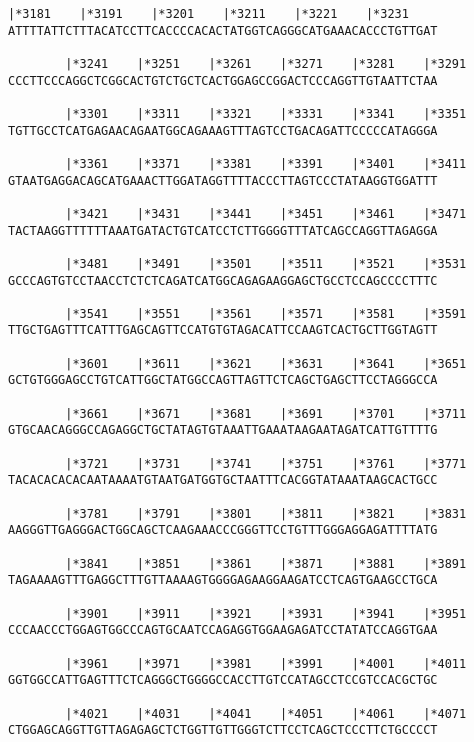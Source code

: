 \documentclass{article}
\begin{document}
\newpage
\begin{Verbatim}[fontfamily=courier]
        |*3181    |*3191    |*3201    |*3211    |*3221    |*3231
ATTTTATTCTTTACATCCTTCACCCCACACTATGGTCAGGGCATGAAACACCCTGTTGAT

        |*3241    |*3251    |*3261    |*3271    |*3281    |*3291
CCCTTCCCAGGCTCGGCACTGTCTGCTCACTGGAGCCGGACTCCCAGGTTGTAATTCTAA

        |*3301    |*3311    |*3321    |*3331    |*3341    |*3351
TGTTGCCTCATGAGAACAGAATGGCAGAAAGTTTAGTCCTGACAGATTCCCCCATAGGGA

        |*3361    |*3371    |*3381    |*3391    |*3401    |*3411
GTAATGAGGACAGCATGAAACTTGGATAGGTTTTACCCTTAGTCCCTATAAGGTGGATTT

        |*3421    |*3431    |*3441    |*3451    |*3461    |*3471
TACTAAGGTTTTTTAAATGATACTGTCATCCTCTTGGGGTTTATCAGCCAGGTTAGAGGA

        |*3481    |*3491    |*3501    |*3511    |*3521    |*3531
GCCCAGTGTCCTAACCTCTCTCAGATCATGGCAGAGAAGGAGCTGCCTCCAGCCCCTTTC

        |*3541    |*3551    |*3561    |*3571    |*3581    |*3591
TTGCTGAGTTTCATTTGAGCAGTTCCATGTGTAGACATTCCAAGTCACTGCTTGGTAGTT

        |*3601    |*3611    |*3621    |*3631    |*3641    |*3651
GCTGTGGGAGCCTGTCATTGGCTATGGCCAGTTAGTTCTCAGCTGAGCTTCCTAGGGCCA

        |*3661    |*3671    |*3681    |*3691    |*3701    |*3711
GTGCAACAGGGCCAGAGGCTGCTATAGTGTAAATTGAAATAAGAATAGATCATTGTTTTG

        |*3721    |*3731    |*3741    |*3751    |*3761    |*3771
TACACACACACAATAAAATGTAATGATGGTGCTAATTTCACGGTATAAATAAGCACTGCC

        |*3781    |*3791    |*3801    |*3811    |*3821    |*3831
AAGGGTTGAGGGACTGGCAGCTCAAGAAACCCGGGTTCCTGTTTGGGAGGAGATTTTATG

        |*3841    |*3851    |*3861    |*3871    |*3881    |*3891
TAGAAAAGTTTGAGGCTTTGTTAAAAGTGGGGAGAAGGAAGATCCTCAGTGAAGCCTGCA

        |*3901    |*3911    |*3921    |*3931    |*3941    |*3951
CCCAACCCTGGAGTGGCCCAGTGCAATCCAGAGGTGGAAGAGATCCTATATCCAGGTGAA

        |*3961    |*3971    |*3981    |*3991    |*4001    |*4011
GGTGGCCATTGAGTTTCTCAGGGCTGGGGCCACCTTGTCCATAGCCTCCGTCCACGCTGC

        |*4021    |*4031    |*4041    |*4051    |*4061    |*4071
CTGGAGCAGGTTGTTAGAGAGCTCTGGTTGTTGGGTCTTCCTCAGCTCCCTTCTGCCCCT

\end{Verbatim}
\end{document}
